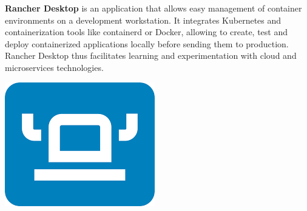 \noindent%
\begin{minipage}{.7\textwidth}%
    \textbf{Rancher Desktop} is an application that allows easy management of container environments on a development workstation. It integrates Kubernetes and containerization tools like containerd or Docker, allowing to create, test and deploy containerized applications locally before sending them to production. Rancher Desktop thus facilitates learning and experimentation with cloud and microservices technologies.
\end{minipage}%
\hfill
\begin{minipage}{.18\textwidth}%
\includegraphics[width=\textwidth]{images/rancher.png}
\end{minipage} \\ \\ \\

